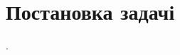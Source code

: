 \documentclass[../../../../document]{subfiles}
\begin{document}
\BeforeChpater{}

\chapter{Постановка задачі}
 \worktheme.\\

\AfterChapter{}
\end{document}
